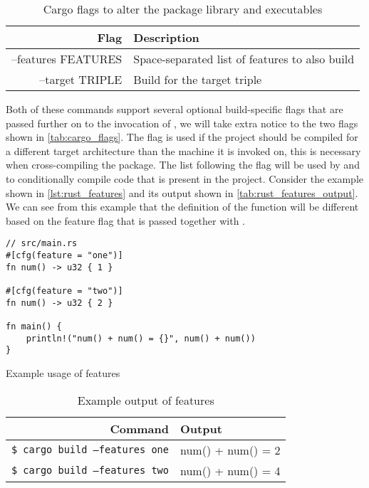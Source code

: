 \begin{table}[ht]
\begin{center}
\begin{tabular}{r|l}
\textbf{Flag} & \textbf{Description}                                   \\
\hline
--features FEATURES   & Space-separated list of features to also build \\
--target TRIPLE       & Build for the target triple                    \\
\hline
\end{tabular}
\caption{Cargo flags to alter the package library and executables}
\label{tab:cargo_flags}
\end{center}
\end{table}

Both of these commands support several optional build-specific flags that are passed further on to the invocation of \rustc, we will take extra notice to the two flags shown in \autoref{tab:cargo_flags}.
The  flag is used if the project should be compiled for a different target architecture than the machine it is invoked on, this is necessary when cross-compiling the package.
The list following the  flag will be used by \cargo and \rustc to conditionally compile code that is present in the project.
Consider the example shown in \autoref{lst:rust_features} and its output shown in \autoref{tab:rust_features_output}.
We can see from this example that the definition of the  function will be different based on the feature flag that is passed together with \cargo.

\begin{listing}[H]
\begin{verbatim}
// src/main.rs
#[cfg(feature = "one")]
fn num() -> u32 { 1 }

#[cfg(feature = "two")]
fn num() -> u32 { 2 }

fn main() {
    println!("num() + num() = {}", num() + num())
}
\end{verbatim}
\caption{Example usage of features}
\label{lst:rust_features}
\end{listing}

\begin{table}[ht]
\begin{center}
\begin{tabular}{r|l}
\textbf{Command} & \textbf{Output}                          \\
\hline
\texttt{\$ cargo build --features one}  & num() + num() = 2 \\
\texttt{\$ cargo build --features two}  & num() + num() = 4 \\
\hline
\end{tabular}
\caption{Example output of features}
\label{tab:rust_features_output}
\end{center}
\end{table}
